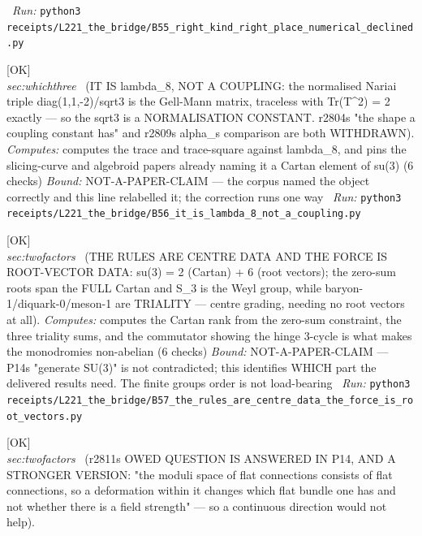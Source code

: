 \begin{description}
\ \emph{Run:} \texttt{python3 receipts/L221\_the\_bridge/B55\_right\_kind\_right\_place\_numerical\_declined.py}
\item[\label{rcpt:B56_it_is_lambda_8_not_a_coupling}\texttt{B56\_it\_is\_lambda\_8\_not\_a\_coupling}]\hfill\textsf{[OK]}\\
\textit{sec:whichthree} \ (IT IS lambda\_8, NOT A COUPLING: the normalised Nariai triple diag(1,1,-2)/sqrt3 is the Gell-Mann matrix, traceless with Tr(T\textasciicircum{}2) = 2 exactly --- so the sqrt3 is a NORMALISATION CONSTANT. r2804s "the shape a coupling constant has" and r2809s alpha\_s comparison are both WITHDRAWN). 
\emph{Computes:} computes the trace and trace-square against lambda\_8, and pins the slicing-curve and algebroid papers already naming it a Cartan element of su(3) (6 checks)
 \emph{Bound:} NOT-A-PAPER-CLAIM --- the corpus named the object correctly and this line relabelled it; the correction runs one way
\ \emph{Run:} \texttt{python3 receipts/L221\_the\_bridge/B56\_it\_is\_lambda\_8\_not\_a\_coupling.py}
\item[\label{rcpt:B57_the_rules_are_centre_data_the_force_is_root_vectors}\texttt{B57\_the\_rules\_are\_centre\_data\_the\_force\_is\_root\_vectors}]\hfill\textsf{[OK]}\\
\textit{sec:twofactors} \ (THE RULES ARE CENTRE DATA AND THE FORCE IS ROOT-VECTOR DATA: su(3) = 2 (Cartan) + 6 (root vectors); the zero-sum roots span the FULL Cartan and S\_3 is the Weyl group, while baryon-1/diquark-0/meson-1 are TRIALITY --- centre grading, needing no root vectors at all). 
\emph{Computes:} computes the Cartan rank from the zero-sum constraint, the three triality sums, and the commutator showing the hinge 3-cycle is what makes the monodromies non-abelian (6 checks)
 \emph{Bound:} NOT-A-PAPER-CLAIM --- P14s "generate SU(3)" is not contradicted; this identifies WHICH part the delivered results need. The finite groups order is not load-bearing
\ \emph{Run:} \texttt{python3 receipts/L221\_the\_bridge/B57\_the\_rules\_are\_centre\_data\_the\_force\_is\_root\_vectors.py}
\item[\label{rcpt:B58_p14_already_answers_the_owed_question}\texttt{B58\_p14\_already\_answers\_the\_owed\_question}]\hfill\textsf{[OK]}\\
\textit{sec:twofactors} \ (r2811s OWED QUESTION IS ANSWERED IN P14, AND A STRONGER VERSION: "the moduli space of flat connections consists of flat connections, so a deformation within it changes which flat bundle one has and not whether there is a field strength" --- so a continuous direction would not help). 

\end{description}
